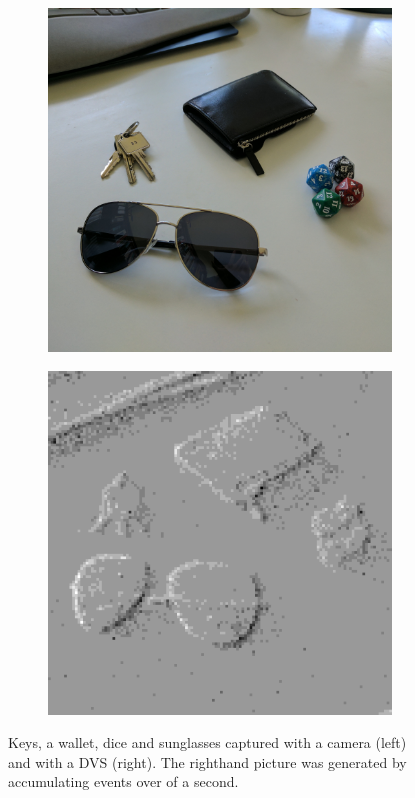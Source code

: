 \begin{figure}[h]
  \centering
  \begin{subfigure}{0.4\textwidth}
    \includegraphics[width=\textwidth]{figures/introduction/objects-camera}
  \end{subfigure}
  \hspace{2em}
  \begin{subfigure}{0.4\textwidth}
    \includegraphics[width=\textwidth]{figures/introduction/objects-dvs}
  \end{subfigure}
  \caption{Keys, a wallet, dice and sunglasses captured with a camera (left) and
    with a DVS (right). The righthand picture was generated by accumulating
    events over  of a second.}
\end{figure}


